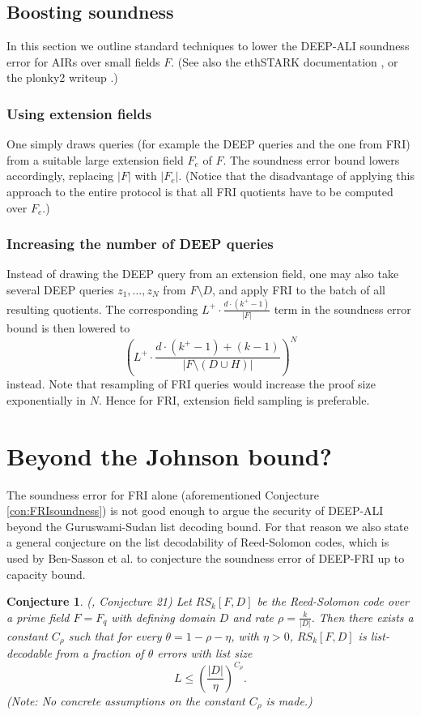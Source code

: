 \documentclass[11pt,article,oneside]{memoir}
\newtheorem{conj}[]{Conjecture}
\theoremstyle{definition}
\theoremstyle{remark}
\begin{document}
\subsection{Boosting soundness}
In this section we outline standard techniques to lower the DEEP-ALI soundness error for AIRs over small fields $F$. 
(See also the ethSTARK documentation \cite{ethSTARK}, or the plonky2 writeup \cite{PolygonZero}.)

\subsubsection{Using extension fields}
One simply draws queries (for example the DEEP queries and the one from FRI) from a suitable large extension field $F_e$ of $F$.
The soundness error bound lowers accordingly, replacing $|F|$ with $|F_e|$. 
(Notice that the disadvantage of applying this approach to the entire protocol is that all FRI quotients have to be computed over $F_e$.)
 
\subsubsection{Increasing the number of DEEP queries}
Instead of drawing the DEEP query from an extension field, one may also take several DEEP queries $z_1,\ldots , z_N$ from $F\setminus D$, and apply FRI to the batch of all resulting quotients. 
The corresponding $L^+\cdot\frac{d\cdot (k^+-1)}{|F|}$ term in the soundness error bound is then lowered to  
\[
\left(L^+\cdot\frac{d\cdot (k^+ - 1) + (k - 1)}{|F\setminus (D\cup H)|}\right)^N
\]
instead. 
Note that resampling of FRI queries would increase the proof size exponentially in $N$. 
Hence for  FRI, extension field sampling is preferable.  

\section{Beyond the Johnson bound?}
\label{s:RSConjecture}

The soundness error for FRI alone (aforementioned Conjecture \ref{con:FRIsoundness}) is not good enough to argue the security of DEEP-ALI beyond the Guruswami-Sudan list decoding bound. 
For that reason we also state a general conjecture on the list decodability of Reed-Solomon codes, which is used by Ben-Sasson et al. to conjecture the soundness error of DEEP-FRI up to capacity bound. 

\begin{conj}
(\cite{DEEPFRI}, Conjecture 21) 
Let $RS_k[F,D]$ be the Reed-Solomon code over a prime field $F=F_q$ with defining domain $D$ and rate $\rho=\frac{k}{|D|}$. 
Then there exists a constant $C_\rho$  such that for every $\theta =1-\rho -\eta$, with $\eta>0$, $RS_k[F,D]$ is list-decodable from a fraction of $\theta$ errors with list size
\[
L \leq\left(\frac{|D|}{\eta}\right)^{C_\rho}.
\]
(Note: No concrete assumptions on the constant $C_\rho$ is made.)
\end{conj}
\end{document}
